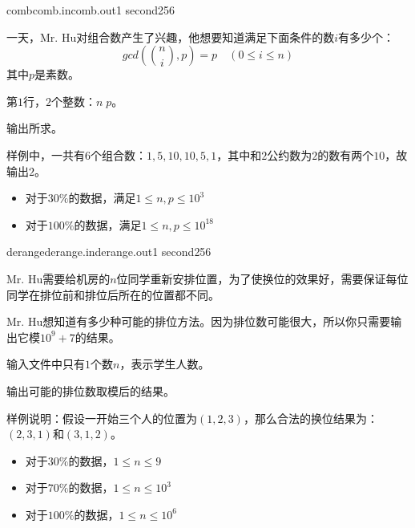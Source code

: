 \documentclass[11pt,a4paper,oneside]{article}
\begin{document}
\begin{problem}{comb}{comb.in}{comb.out}{1 second}{256}
	
	一天，Mr. Hu对组合数产生了兴趣，他想要知道满足下面条件的数$i$有多少个：
	$$
		gcd(\binom{n}{i},p) = p \quad ( 0 \leq i \leq n )
	$$
	其中$p$是素数。
	
	\InputFile
	
	第$1$行，$2$个整数：$n \; p$。
	
	\OutputFile
	
	输出所求。
	
	\Example
	
	\begin{example}
\end{example}

\Note
	样例中，一共有$6$个组合数：$1, 5, 10, 10, 5, 1$，其中和$2$公约数为$2$的数有两个$10$，故输出$2$。
	\begin{itemize}
		\item 对于$30\%$的数据，满足$ 1 \leq n, p \leq 10^3 $
		\item 对于$100\%$的数据，满足$ 1 \leq n, p \leq 10^{18} $
	\end{itemize}
\end{problem}

\begin{problem}{derange}{derange.in}{derange.out}{1 second}{256}
	
	Mr. Hu需要给机房的$n$位同学重新安排位置，为了使换位的效果好，需要保证每位同学在排位前和排位后所在的位置都不同。
	
	Mr. Hu想知道有多少种可能的排位方法。因为排位数可能很大，所以你只需要输出它模$10^9 + 7$的结果。
	
	\InputFile
	
	输入文件中只有$1$个数$n$，表示学生人数。
	
	\OutputFile
	
	输出可能的排位数取模后的结果。
	
	\Example
	
	\begin{example}
\end{example}

\Note
	样例说明：假设一开始三个人的位置为$(1,2,3)$，那么合法的换位结果为：$(2,3,1)$和$(3,1,2)$。
	\begin{itemize}
		\item 对于$30\%$的数据，$ 1 \leq n \leq 9 $
		\item 对于$70\%$的数据，$ 1 \leq n \leq 10^3 $
		\item 对于$100\%$的数据，$ 1 \leq n \leq 10^6 $
	\end{itemize}
\end{problem}
\end{document}
